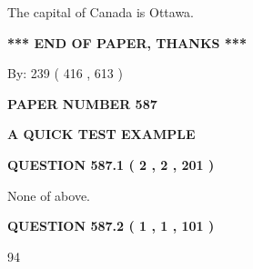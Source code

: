 \documentclass[12pt]{article}
\begin{document}
 
\noindent{}
 
 
The capital of Canada is Ottawa.
 
 
 
 
   
   
 \vspace{0.2in}
 
   
   
   
   
\vspace{1.0in} 
{\textbf{\large{ *** END OF PAPER, THANKS *** }}} 
   
   
\hspace{1.0in} By: 
 239 ( 416 ,  613 )
   
   
   
   
\newpage 
\setcounter{page}{ 
   587001 } 
   
   
   
   
 {\textbf{ \Large{ PAPER NUMBER  587  }}}
   
   
\vspace{0.2in}
   
   
   
   
   
   
 \vspace{0.2in}
{\LARGE {\textbf{ A QUICK TEST EXAMPLE}}}
   
   
  
\vspace{0.2in}
  
{\textbf{\Large{QUESTION
587.1 
 ( 2 , 2 , 201 )
}}}
  
  
 
 
\noindent{}
 
 
 None of above.
 
 
 
 
  
\vspace{0.2in}
  
{\textbf{\Large{QUESTION
587.2 
 ( 1 , 1 , 101 )
}}}
  
  
 
 
\noindent{}

94
 
\end{document}
